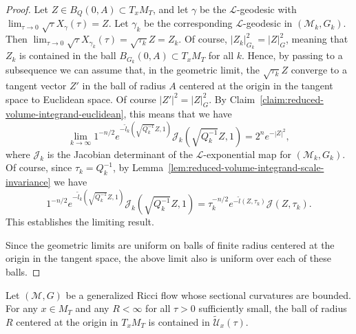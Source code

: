 \begin{proof}
Let $Z\in B_Q(0,A)\subset T_xM_T$, and let $\gamma$ be the
${\mathcal L}$-geodesic with $\lim_{\tau\rightarrow
0}\sqrt{\tau}X_\gamma(\tau)=Z$. Let $\gamma_k$ be the corresponding
${\mathcal L}$-geodesic in $({\mathcal M}_k,G_k)$. Then $\lim_{\tau\rightarrow
0}\sqrt{\tau}X_{\gamma_k}(\tau)=\sqrt{\tau_k}Z=Z_k$. Of course,
$|Z_k|^2_{G_k}=|Z|^2_G$, meaning that $Z_k$ is contained in the ball
$B_{G_k}(0,A)\subset T_xM_T$ for all $k$. Hence, by passing to a
subsequence we can assume that, in the geometric limit, the
$\sqrt{\tau_k}Z$ converge to a tangent vector $Z'$ in the ball of
radius $A$ centered at the origin in the tangent space to Euclidean
space. Of course $|Z'|^2=|Z|_G^2$. By Claim~\ref{claim:reduced-volume-integrand-euclidean}, this
means that we have
$$\lim_{k\rightarrow \infty}1^{-n/2}e^{-\tilde l_k(\sqrt{Q_k^{-1}}Z,1)}{\mathcal
J}_k(\sqrt{Q_k^{-1}}Z,1)=2^ne^{-|Z|^2},$$ where ${\mathcal J}_k$ is
the Jacobian determinant of the ${\mathcal L}$-exponential map for
$({\mathcal M}_k,G_k)$.
 Of course, since
$\tau_k=Q_k^{-1}$, by Lemma~\ref{lem:reduced-volume-integrand-scale-invariance} we have
$$1^{-n/2}e^{-\tilde l_k(\sqrt{Q_k^{-1}}Z,1)}{\mathcal
J}_k(\sqrt{Q_k^{-1}}Z,1)=\tau_k^{-n/2}e^{-\tilde
l(Z,\tau_k)}{\mathcal J}(Z,\tau_k).$$ This establishes the limiting
result.

Since the geometric limits are uniform on balls of finite radius
centered at the origin in the tangent space, the above limit also is
uniform over each of these balls.
\end{proof}

\begin{corollary}\label{cor:injectivity-set-contains-ball-small-tau}
\label{Jlimit1}
Let $({\mathcal M},G)$ be a generalized Ricci flow whose sectional
curvatures are bounded. For any $x\in M_T$ and any $R<\infty$ for
all $\tau>0$ sufficiently small, the ball of radius $R$ centered at
the origin in $T_xM_T$ is contained in $\widetilde {\mathcal
U}_x(\tau)$.
\end{corollary}



